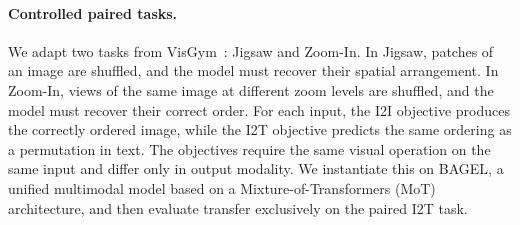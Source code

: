 \paragraph{Controlled paired tasks.}
We adapt two tasks from VisGym~\citep{wang2026visgym}: Jigsaw and Zoom-In. 
In Jigsaw, patches of an image are shuffled, and the model must recover their spatial arrangement.
In Zoom-In, views of the same image at different zoom levels are shuffled, and the model must recover their correct order. 
For each input, the I2I objective produces the correctly ordered image, while the I2T objective predicts the same ordering as a permutation in text. 
The objectives require the same visual operation on the same input and differ only in output modality.
We instantiate this on BAGEL, a unified multimodal model based on a Mixture-of-Transformers (MoT) architecture, and then evaluate transfer exclusively on the paired I2T task.
